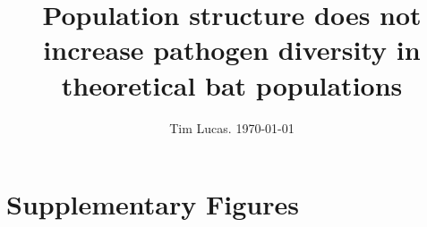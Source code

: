\documentclass[a4paper,10pt,reqno]{amsart}
\begin{document}
\title{Population structure does not increase pathogen diversity in theoretical bat populations}
\author{Tim Lucas. \today}
\date{}

\maketitle





\clearpage
\appendix
\section{Supplementary Figures}






\small
\printbibliography 
\end{document}
